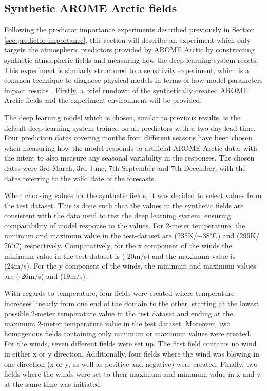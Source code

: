 \documentclass[../main/thesis.tex]{subfiles}
\begin{document}
\subsection{Synthetic AROME Arctic fields}
\label{sec:synthetic_preds}
Following the predictor importance experiments described previously in Section \ref{sec:predictor-importance}, this section will describe an experiment which only targets the atmospheric predictors provided by AROME Arctic by constructing synthetic atmospheric fields and measuring how the deep learning system reacts. This experiment is similarly structured to a sensitivity experiment, which is a common technique to diagnose physical models in terms of how model parameters impact results \citep{Kim2006}. Firstly, a brief rundown of the synthetically created AROME Arctic fields and the experiment environment will be provided.

The deep learning model which is chosen, similar to previous results, is the default deep learning system trained on all predictors with a two day lead time. Four prediction dates covering months from different seasons have been chosen when measuring how the model responds to artificial AROME Arctic data, with the intent to also measure any seasonal variability in the responses. The chosen dates were 3rd March, 3rd June, 7th September and 7th December, with the dates referring to the valid date of the forecasts.

When choosing values for the synthetic fields, it was decided to select values from the test dataset. This is done such that the values in the synthetic fields are consistent with the data used to test the deep learning system, ensuring comparability of model response to the values. For 2-meter temperature, the minimum and maximum value in the test-dataset are (235K/$-38^{\circ}$C) and (299K/$26^{\circ}C$) respectively. Comparatively, for the x component of the winds the minimum value in the test-dataset is (-20m/s) and the maximum value is (24m/s). For the y component of the winds, the minimum and maximum values are (-26m/s) and (19m/s).

With regards to temperature, four fields were created where temperature increases linearly from one end of the domain to the other, starting at the lowest possible 2-meter temperature value in the test dataset and ending at the maximum 2-meter temperature value in the test dataset. Moreover, two homogenous fields containing only minimum or maximum values were created. For the winds, seven different fields were set up. The first field contains no wind in either x or y direction. Additionally, four fields where the wind was blowing in one direction (x or y, as well as positive and negative) were created. Finally, two fields where the winds were set to their maximum and minimum value in x and y at the same time was initiated.
\end{document}
